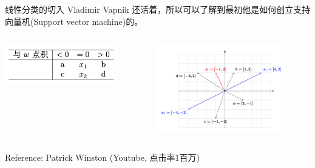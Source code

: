 \documentclass[handout]{ctexbeamer}
\begin{document}
\begin{frame}{线性分类的切入}
Vladimir Vapnik 还活着，所以可以了解到最初他是如何创立支持向量机(Support vector machine)的。
\begin{columns}
\begin{column}{0.3\textwidth}
\centering
\includegraphics[width=\textwidth]{fig/P2dotpTable}
\end{column}
\begin{column}{0.7\textwidth}
	\begin{figure}[H]
	\centering
	\includegraphics[width=\textwidth]{fig/C2C2dotprodt}
\end{figure}	
\end{column}
\end{columns}
Reference: Patrick Winston (Youtube, 点击率1百万)
\end{frame}

\newcommand{\notimplies}{\;\not\!\!\implies}
\end{document}
